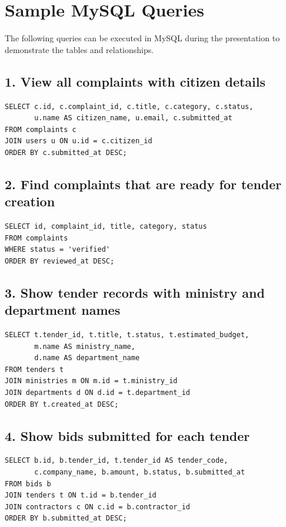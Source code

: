 \documentclass[12pt,a4paper,oneside,openany]{report}
\begin{document}
\chapter*{Sample MySQL Queries}
{}
The following queries can be executed in MySQL during the presentation to demonstrate the tables and relationships.

\section*{1. View all complaints with citizen details}
\begin{lstlisting}
SELECT c.id, c.complaint_id, c.title, c.category, c.status,
       u.name AS citizen_name, u.email, c.submitted_at
FROM complaints c
JOIN users u ON u.id = c.citizen_id
ORDER BY c.submitted_at DESC;
\end{lstlisting}

\section*{2. Find complaints that are ready for tender creation}
\begin{lstlisting}
SELECT id, complaint_id, title, category, status
FROM complaints
WHERE status = 'verified'
ORDER BY reviewed_at DESC;
\end{lstlisting}

\section*{3. Show tender records with ministry and department names}
\begin{lstlisting}
SELECT t.tender_id, t.title, t.status, t.estimated_budget,
       m.name AS ministry_name,
       d.name AS department_name
FROM tenders t
JOIN ministries m ON m.id = t.ministry_id
JOIN departments d ON d.id = t.department_id
ORDER BY t.created_at DESC;
\end{lstlisting}

\section*{4. Show bids submitted for each tender}
\begin{lstlisting}
SELECT b.id, b.tender_id, t.tender_id AS tender_code,
       c.company_name, b.amount, b.status, b.submitted_at
FROM bids b
JOIN tenders t ON t.id = b.tender_id
JOIN contractors c ON c.id = b.contractor_id
ORDER BY b.submitted_at DESC;
\end{lstlisting}
\end{document}
